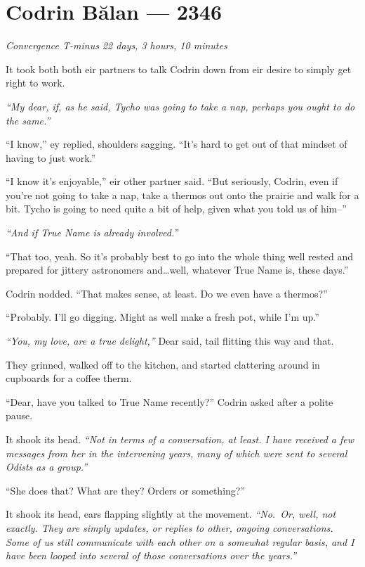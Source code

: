 \hypertarget{codrin-bux103lan-2346}{%
\chapter{Codrin Bălan — 2346}\label{codrin-bux103lan-2346}}

\begin{center}
\emph{Convergence T-minus 22 days, 3 hours, 10 minutes}
\end{center}

\noindent It took both both eir partners to talk Codrin down from eir desire to simply get right to work.

\emph{``My dear, if, as he said, Tycho was going to take a nap, perhaps you ought to do the same.''}

``I know,'' ey replied, shoulders sagging. ``It's hard to get out of that mindset of having to just work.''

``I know it's enjoyable,'' eir other partner said. ``But seriously, Codrin, even if you're not going to take a nap, take a thermos out onto the prairie and walk for a bit. Tycho is going to need quite a bit of help, given what you told us of him--''

\emph{``And if True Name is already involved.''}

``That too, yeah. So it's probably best to go into the whole thing well rested and prepared for jittery astronomers and\ldots well, whatever True Name is, these days.''

Codrin nodded. ``That makes sense, at least. Do we even have a thermos?''

``Probably. I'll go digging. Might as well make a fresh pot, while I'm up.''

\emph{``You, my love, are a true delight,''} Dear said, tail flitting this way and that.

They grinned, walked off to the kitchen, and started clattering around in cupboards for a coffee therm.

``Dear, have you talked to True Name recently?'' Codrin asked after a polite pause.

It shook its head. \emph{``Not in terms of a conversation, at least. I have received a few messages from her in the intervening years, many of which were sent to several Odists as a group.''}

``She does that? What are they? Orders or something?''

It shook its head, ears flapping slightly at the movement. \emph{``No.~Or, well, not exactly. They are simply updates, or replies to other, ongoing conversations. Some of us still communicate with each other on a somewhat regular basis, and I have been looped into several of those conversations over the years.''}

